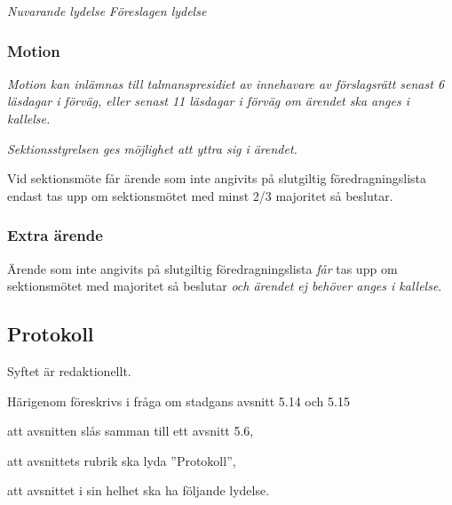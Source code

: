 \documentclass{article}
\newenvironment{lydelse}
    {\begin{paracol}{2}%
        \emph{Nuvarande lydelse}%
        \switchcolumn%
        \emph{Föreslagen lydelse}%
    \end{paracol}%
    \begin{enumerate}[label=\thesubsection.\arabic*]%
    \begin{paracol}{2}%
    }{\end{paracol}\end{enumerate}}
\begin{document}
\begin{lydelse}
  \switchcolumn
  \subsubsection*{Motion}
  \item \emph{Motion kan inlämnas till talmanspresidiet av innehavare av förslagsrätt senast 6 läsdagar i förväg, eller senast 11 läsdagar i förväg om ärendet ska anges i kallelse.}
  \item \emph{Sektionsstyrelsen ges möjlighet att yttra sig i ärendet.}
 
  \switchcolumn*
  \setcounter{subsection}{18} 
  \setcounter{enumi}{0}
  \item Vid sektionsmöte får ärende som inte angivits på slutgiltig
  före\-drag\-nings\-lista endast tas upp om sektionsmötet med minst 2/3 majoritet så beslutar.
  
  \switchcolumn
  \subsubsection*{Extra ärende}
  \item Ärende som inte angivits på slutgiltig föredragningslista \emph{får} tas upp om sektionsmötet med  majoritet så beslutar \emph{och ärendet ej behöver anges i kallelse}. \label{maj:eä}
\end{lydelse}

\setcounter{subsection}{5}
\subsection{Protokoll}
Syftet är redaktionellt.

Härigenom föreskrivs i fråga om stadgans avsnitt 5.14 och 5.15
\begin{dels}
\item att avsnitten slås samman till ett avsnitt 5.6,
\item att avsnittets rubrik ska lyda ''Protokoll'',
\item att avsnittet i sin helhet ska ha följande lydelse.
\end{dels}
\end{document}
